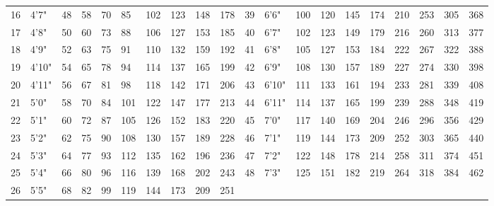 \begin{normbox}
\begin{tabularx}{\linewidth}{@{} X X X X X X X X X X | X X X X X X X X X X}
16 & 4'7" & 48 & 58 & 70 & 85 & 102 & 123 & 148 & 178 & 39 & 6'6" & 100 & 120 & 145 & 174 & 210 & 253 & 305 & 368\\
17 & 4'8" & 50 & 60 & 73 & 88 & 106 & 127 & 153 & 185 & 40 & 6'7" & 102 & 123 & 149 & 179 & 216 & 260 & 313 & 377\\
18 & 4'9" & 52 & 63 & 75 & 91 & 110 & 132 & 159 & 192 & 41 & 6'8" & 105 & 127 & 153 & 184 & 222 & 267 & 322 & 388\\
19 & 4'10" & 54 & 65 & 78 & 94 & 114 & 137 & 165 & 199 & 42 & 6'9" & 108 & 130 & 157 & 189 & 227 & 274 & 330 & 398\\
20 & 4'11" & 56 & 67 & 81 & 98 & 118 & 142 & 171 & 206 & 43 & 6'10" & 111 & 133 & 161 & 194 & 233 & 281 & 339 & 408\\
21 & 5'0" & 58 & 70 & 84 & 101 & 122 & 147 & 177 & 213 & 44 & 6'11" & 114 & 137 & 165 & 199 & 239 & 288 & 348 & 419\\
22 & 5'1" & 60 & 72 & 87 & 105 & 126 & 152 & 183 & 220 & 45 & 7'0" & 117 & 140 & 169 & 204 & 246 & 296 & 356 & 429\\
23 & 5'2" & 62 & 75 & 90 & 108 & 130 & 157 & 189 & 228 & 46 & 7'1" & 119 & 144 & 173 & 209 & 252 & 303 & 365 & 440\\
24 & 5'3" & 64 & 77 & 93 & 112 & 135 & 162 & 196 & 236 & 47 & 7'2" & 122 & 148 & 178 & 214 & 258 & 311 & 374 & 451\\
25 & 5'4" & 66 & 80 & 96 & 116 & 139 & 168 & 202 & 243 & 48 & 7'3" & 125 & 151 & 182 & 219 & 264 & 318 & 384 & 462\\
26 & 5'5" & 68 & 82 & 99 & 119 & 144 & 173 & 209 & 251 & 									
\end{tabularx}
\end{normbox}
